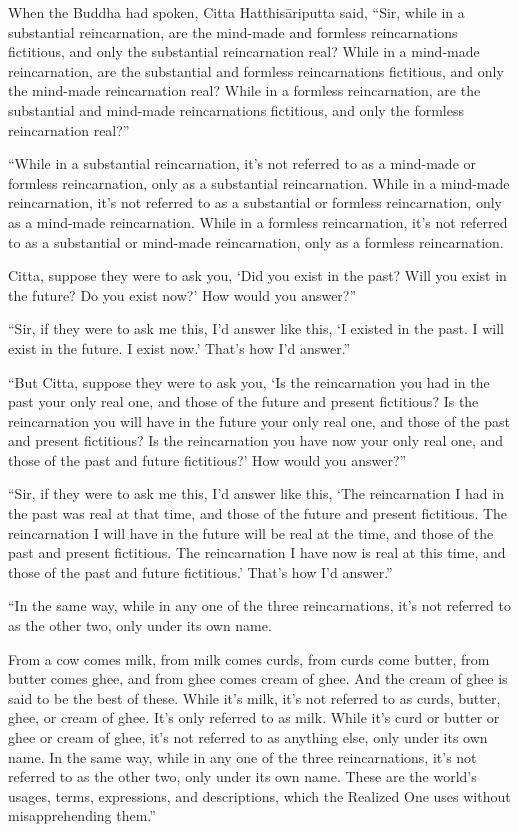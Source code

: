 \documentclass[12pt,openany]{book}%
\begin{document}
When the Buddha had spoken, Citta \textsanskrit{Hatthisāriputta} said, “Sir, while in a substantial reincarnation, are the mind-made and formless reincarnations fictitious, and only the substantial reincarnation real? While in a mind-made reincarnation, are the substantial and formless reincarnations fictitious, and only the mind-made reincarnation real? While in a formless reincarnation, are the substantial and mind-made reincarnations fictitious, and only the formless reincarnation real?” 

“While in a substantial reincarnation, it’s not referred to as a mind-made or formless reincarnation, only as a substantial reincarnation. While in a mind-made reincarnation, it’s not referred to as a substantial or formless reincarnation, only as a mind-made reincarnation. While in a formless reincarnation, it’s not referred to as a substantial or mind-made reincarnation, only as a formless reincarnation. 

Citta, suppose they were to ask you, ‘Did you exist in the past? Will you exist in the future? Do you exist now?’ How would you answer?” 

“Sir, if they were to ask me this, I’d answer like this, ‘I existed in the past. I will exist in the future. I exist now.’ That’s how I’d answer.” 

“But Citta, suppose they were to ask you, ‘Is the reincarnation you had in the past your only real one, and those of the future and present fictitious? Is the reincarnation you will have in the future your only real one, and those of the past and present fictitious? Is the reincarnation you have now your only real one, and those of the past and future fictitious?’ How would you answer?” 

“Sir, if they were to ask me this, I’d answer like this, ‘The reincarnation I had in the past was real at that time, and those of the future and present fictitious. The reincarnation I will have in the future will be real at the time, and those of the past and present fictitious. The reincarnation I have now is real at this time, and those of the past and future fictitious.’ That’s how I’d answer.” 

“In the same way, while in any one of the three reincarnations, it’s not referred to as the other two, only under its own name. 

From a cow comes milk, from milk comes curds, from curds come butter, from butter comes ghee, and from ghee comes cream of ghee. And the cream of ghee is said to be the best of these. While it’s milk, it’s not referred to as curds, butter, ghee, or cream of ghee. It’s only referred to as milk. While it’s curd or butter or ghee or cream of ghee, it’s not referred to as anything else, only under its own name. In the same way, while in any one of the three reincarnations, it’s not referred to as the other two, only under its own name. These are the world’s usages, terms, expressions, and descriptions, which the Realized One uses without misapprehending them.” 
\end{document}
